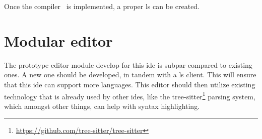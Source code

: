 Once the compiler~\cite{wiig} is implemented, a proper \gls*{ls} can be created.

\section{Modular editor}

The prototype editor module develop for this \gls*{ide} is subpar compared to
existing ones. A new one should be developed, in tandem with a \gls*{ls} client.
This will ensure that this \gls*{ide} can support more languages. This editor
should then utilize existing technology that is already used by other
\gls*{ide}s, like the tree-sitter\footnote{\url{https://github.com/tree-sitter/tree-sitter}}
parsing system, which amongst other things, can help with syntax highlighting.
